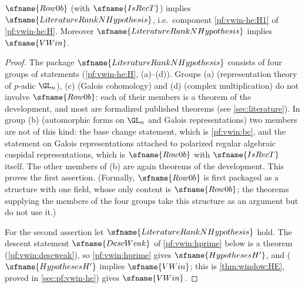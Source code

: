 \begin{lemma}\label{pf:vwin:litN}
$\sfname{Row0b}$ (with $\sfname{IsRecT}$) implies $\sfname{LiteratureRankNHypothesis}$, i.e.\ component
\ref{pf:vwin-he:H1} of \cref{pf:vwin-he:H}. Moreover $\sfname{LiteratureRankNHypothesis}$ implies $\sfname{VWin}$.
\end{lemma}

\begin{proof}
The package $\sfname{LiteratureRankNHypothesis}$ consists of four groups of statements (\cref{pf:vwin-he:H}, (a)--(d)).
Groups (a) (representation theory of $p$-adic $\GL_n$), (c) (Galois cohomology) and (d) (complex multiplication) do
not involve $\sfname{Row0b}$: each of their members is a theorem of the development, and most are formalized published
theorems (see \cref{sec:literature}). In group (b) (automorphic forms on $\GL_n$ and Galois representations) two
members are not of this kind: the base change statement, which is \cref{pf:vwin:bc}, and the statement on Galois
representations attached to polarized regular algebraic cuspidal representations, which is $\sfname{Row0b}$ with
$\sfname{IsRecT}$ itself. The other members of (b) are again theorems of the development. This proves the first
assertion. (Formally, $\sfname{Row0b}$ is first packaged as a structure with one field, whose only content is
$\sfname{Row0b}$; the theorems supplying the members of the four groups take this structure as an argument but do not
use it.)

For the second assertion let $\sfname{LiteratureRankNHypothesis}$ hold. The descent statement
$\sfname{DescWeak}$ of \cref{pf:vwin:hprime} below is a theorem (\cref{pf:vwin:descweak}), so \cref{pf:vwin:hprime}
gives $\sfname{HypothesesH'}$, and 
($\sfname{HypothesesH'}$ implies $\sfname{VWin}$; this is \cref{thm:window:HE}, proved in \cref{sec:pf:vwin-he})
gives $\sfname{VWin}$.
\end{proof}

